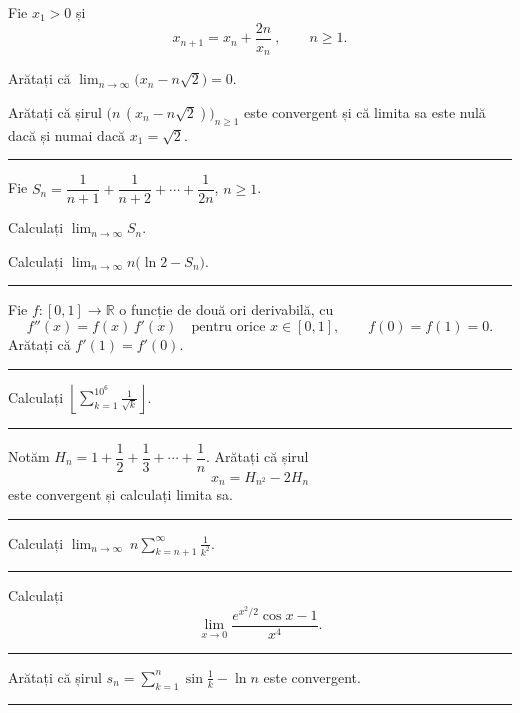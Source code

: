 Fie $x_1>0$ și
\[ x_{n+1}=x_n+\frac{2n}{x_n}\ ,\qquad n\ge1 . \]
\begin{parti}
  \item Arătați că $\displaystyle\lim_{n\to\infty}\bigl(x_n-n\sqrt2\bigr)=0$.
  \item Arătați că șirul $\bigl(n\,(x_n-n\sqrt2)\bigr)_{n\ge1}$ este convergent și că limita sa este nulă dacă și numai dacă $x_1=\sqrt2$.
\end{parti}
\vspace{1mm}\hrule

Fie $S_n=\dfrac1{n+1}+\dfrac1{n+2}+\cdots+\dfrac1{2n}$, $n\ge1$.
\begin{parti}
  \item Calculați $\displaystyle\lim_{n\to\infty}S_n$.
  \item Calculați $\displaystyle\lim_{n\to\infty}n\bigl(\ln2-S_n\bigr)$.
\end{parti}
\vspace{1mm}\hrule

Fie $f:[0,1]\to\mathbb{R}$ o funcție de două ori derivabilă, cu
\[ f''(x)=f(x)\,f'(x)\quad\text{pentru orice }x\in[0,1],\qquad f(0)=f(1)=0 . \]
Arătați că $f'(1)=f'(0)$.
\vspace{1mm}\hrule

Calculați $\left\lfloor\displaystyle\sum_{k=1}^{10^6}\frac1{\sqrt k}\right\rfloor$.
\vspace{1mm}\hrule

Notăm $H_{n}=1+\dfrac12+\dfrac13+\cdots+\dfrac1n$. Arătați că șirul
\[ x_{n}=H_{n^{2}}-2H_{n} \]
este convergent și calculați limita sa.
\vspace{1mm}\hrule

Calculați $\displaystyle\lim_{n\to\infty}\ n\sum_{k=n+1}^{\infty}\frac1{k^2}$.
\vspace{1mm}\hrule

Calculați
\[ \lim_{x\to0}\frac{e^{x^2/2}\cos x-1}{x^4} . \]
\vspace{1mm}\hrule

Arătați că șirul $s_n=\displaystyle\sum_{k=1}^{n}\sin\frac1k-\ln n$ este convergent.
\vspace{1mm}\hrule

